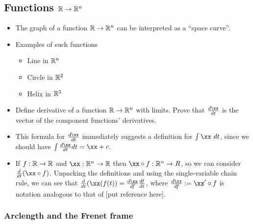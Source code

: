 \subsection*{Functions $\mathbb{R} \rightarrow \mathbb{R}^n$}

\begin{itemize}
    \item The graph of a function $\mathbb{R} \rightarrow \mathbb{R}^n$ can be interpreted as a ``space curve''.
    \item Examples of such functions
    \begin{itemize}
        \item Line in $\mathbb{R}^n$
        \item Circle in $\mathbb{R}^2$
        \item Helix in $\mathbb{R}^3$
    \end{itemize}
    \item Define derivative of a function $\mathbb{R} \rightarrow \mathbb{R}^n$ with limits. Prove that $\frac{d\xx}{dt}$ is the vector of the component functions' derivatives.
    \item This formula for $\frac{d\xx}{dt}$ immediately suggests a definition for $\int \xx \spc dt$, since we should have $\int \frac{d\xx}{dt} dt = \xx + c$.
    \item If $f:\mathbb{R} \rightarrow \mathbb{R}$ and $\xx:\R^n \rightarrow \R$ then $\xx \circ f:\R^n \rightarrow R$, so we can consider $\frac{d}{dt}(\xx \circ f)$. Unpacking the definitions and using the single-variable chain rule, we can see that $\frac{d}{dt}(\xx(f(t)) = \frac{d\xx}{df} \frac{df}{dt}$, where $\frac{d\xx}{df} := \xx' \circ f$ is notation analogous to that of [put reference here].
\end{itemize}

\subsubsection*{Arclength and the Frenet frame}

